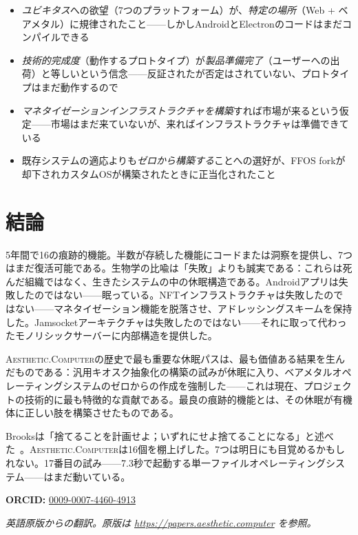 \documentclass[10pt,letterpaper,twocolumn]{article}
\newcommand{\ac}{\textsc{Aesthetic.Computer}}
\begin{document}
\begin{itemize}
  \item \emph{ユビキタス}への欲望（7つのプラットフォーム）が、\emph{特定の場所}（Web + ベアメタル）に規律されたこと——しかしAndroidとElectronのコードはまだコンパイルできる
  \item \emph{技術的完成度}（動作するプロトタイプ）が\emph{製品準備完了}（ユーザーへの出荷）と等しいという信念——反証されたが否定はされていない、プロトタイプはまだ動作するので
  \item \emph{マネタイゼーションインフラストラクチャを構築}すれば市場が来るという仮定——市場はまだ来ていないが、来ればインフラストラクチャは準備できている
  \item 既存システムの適応よりも\emph{ゼロから構築する}ことへの選好が、FFOS forkが却下されカスタムOSが構築されたときに正当化されたこと
\end{itemize}

\section{結論}

5年間で16の痕跡的機能。半数が存続した機能にコードまたは洞察を提供し、7つはまだ復活可能である。生物学の比喩は「失敗」よりも誠実である：これらは死んだ組織ではなく、生きたシステムの中の休眠構造である。Androidアプリは失敗したのではない——眠っている。NFTインフラストラクチャは失敗したのではない——マネタイゼーション機能を脱落させ、アドレッシングスキームを保持した。Jamsocketアーキテクチャは失敗したのではない——それに取って代わったモノリシックサーバーに内部構造を提供した。

\ac{}の歴史で最も重要な休眠パスは、最も価値ある結果を生んだものである：汎用キオスク抽象化の構築の試みが休眠に入り、ベアメタルオペレーティングシステムのゼロからの作成を強制した——これは現在、プロジェクトの技術的に最も特徴的な貢献である。最良の痕跡的機能とは、その休眠が有機体に正しい肢を構築させたものである。

Brooksは「捨てることを計画せよ；いずれにせよ捨てることになる」と述べた~\citep{brooks1975mythical}。\ac{}は16個を棚上げした。7つは明日にも目覚めるかもしれない。17番目の試み——7.3秒で起動する単一ファイルオペレーティングシステム——はまだ動いている。

\vspace{0.5em}
\noindent\textbf{ORCID:} \href{https://orcid.org/0009-0007-4460-4913}{0009-0007-4460-4913}

\vspace{0.5em}
\noindent\textit{英語原版からの翻訳。原版は \url{https://papers.aesthetic.computer} を参照。}



\end{document}
